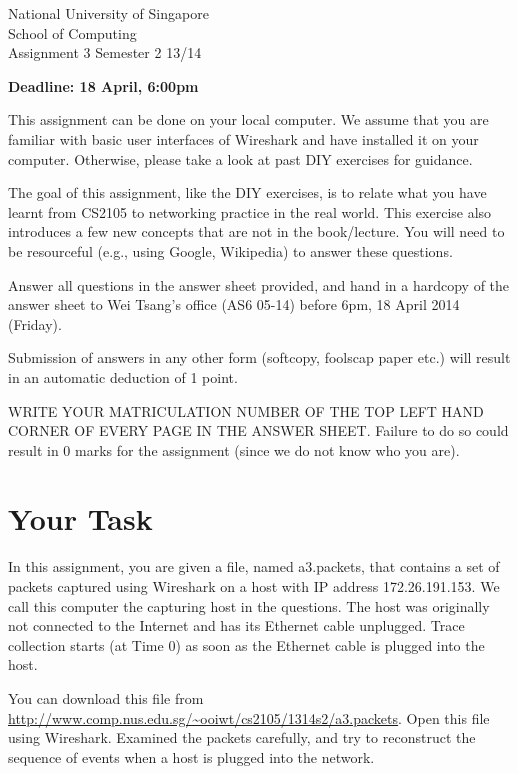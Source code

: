 \documentclass[a4paper,12pt,answers]{exam}
\begin{document}
\extraheadheight{.5in}
%
{\large\sf National University of Singapore\\ School of Computing \\
\LARGE\sf Assignment 3}%
{\large\sf Semester 2 13/14}
\firstpageheadrule
\pagestyle{headandfoot} 


\textbf{Deadline: 18 April, 6:00pm}

This assignment can be done on your local computer. We assume that you are
familiar with basic user interfaces of Wireshark and have installed it on your
computer. Otherwise, please take a look at past DIY exercises for guidance.

The goal of this assignment, like the DIY exercises, is to relate what you have
learnt from CS2105 to networking practice in the real world. This exercise also
introduces a few new concepts that are not in the book/lecture. You will need to
be resourceful (e.g., using Google, Wikipedia) to answer these questions.

Answer all questions in the answer sheet provided, and hand in a hardcopy of the
answer sheet to Wei Tsang's office (AS6 05-14) before 6pm, 18 April 2014 (Friday).

Submission of answers in any other form (softcopy, foolscap paper etc.) will result 
in an automatic deduction of 1 point.  

WRITE YOUR MATRICULATION NUMBER OF THE TOP LEFT HAND CORNER OF EVERY PAGE IN THE ANSWER SHEET.  Failure to do so could result in 0 marks for the assignment (since we do not know who you are).

\section*{Your Task}

In this assignment, you are given a file, named a3.packets, that contains a set
of packets captured using Wireshark on a host with IP address 172.26.191.153.
We call this computer the capturing host in the questions. The host was
originally not connected to the Internet and has its Ethernet cable unplugged.
Trace collection starts (at Time 0) as soon as the Ethernet cable is plugged into the host.

You can download this file from
\url{http://www.comp.nus.edu.sg/~ooiwt/cs2105/1314s2/a3.packets}. Open this file
using Wireshark. Examined the packets carefully, and try to reconstruct the
sequence of events when a host is plugged into the network.
\end{document}
